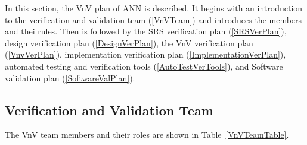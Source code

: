 \documentclass[12pt, titlepage]{article}
\begin{document}
In this section, the VnV plan of ANN is described. 
It begins with an introduction to the verification and validation team (\autoref{VnVTeam}) and 
introduces the members and thei rules. 
Then is followed by the SRS verification plan (\autoref{SRSVerPlan}), 
design verification plan (\autoref{DesignVerPlan}), 
the VnV verification plan (\autoref{VnvVerPlan}), 
implementation verification plan (\autoref{ImplementationVerPlan}), 
automated testing and verification tools (\autoref{AutoTestVerTools}), and
Software validation plan (\autoref{SoftwareValPlan}).


\subsection{Verification and Validation Team}\label{VnVTeam}

The VnV team members and their roles are shown in Table~\ref{VnVTeamTable}.

\begin{center}
  \begin{table}[h]
  \caption{Verification and validation team} 
  \label{VnVTeamTable}
  \end{table}
  \end{center}
\end{document}
